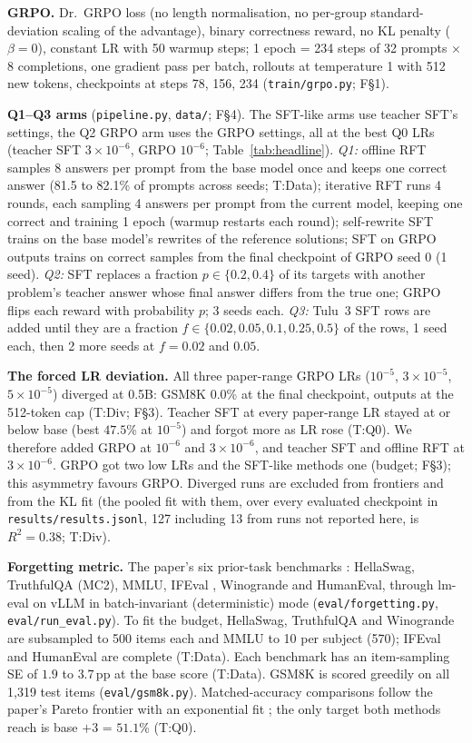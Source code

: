 \documentclass[11pt]{article}
\newcommand{\pp}{\,pp\xspace}
\newcommand{\T}[1]{\textsf{T:#1}}
\newcommand{\F}[1]{\textsf{F\S#1}}
\begin{document}
\textbf{GRPO.} Dr.~GRPO loss \cite{drgrpo} (no length normalisation, no per-group standard-deviation scaling of the
advantage), binary correctness reward, no KL penalty ($\beta = 0$), constant LR with 50 warmup steps; 1 epoch = 234
steps of 32 prompts $\times$ 8 completions, one gradient pass per batch, rollouts at temperature 1 with 512 new
tokens, checkpoints at steps 78, 156, 234 (\texttt{train/grpo.py}; \F{1}).

\textbf{Q1--Q3 arms} (\texttt{pipeline.py}, \texttt{data/}; \F{4}). The SFT-like arms use teacher SFT's settings, the
Q2 GRPO arm uses the GRPO settings, all at the best Q0 LRs (teacher SFT $3\times10^{-6}$, GRPO $10^{-6}$; Table~\ref{tab:headline}). \emph{Q1:} offline RFT samples 8
answers per prompt from the base model once and keeps one correct answer (81.5 to 82.1\% of prompts across seeds; \T{Data}); iterative RFT
runs 4 rounds, each sampling 4 answers per prompt from the current model, keeping one correct and training 1 epoch (warmup restarts each round);
self-rewrite SFT trains on the base model's rewrites of the reference solutions; SFT on GRPO outputs trains on
correct samples from the final checkpoint of GRPO seed 0 (1 seed). \emph{Q2:} SFT replaces a fraction
$p \in \{0.2, 0.4\}$ of its targets with another problem's teacher answer whose final answer differs from the true
one; GRPO flips each reward with probability $p$; 3 seeds each. \emph{Q3:} Tulu~3 \cite{tulu3} SFT rows are added
until they are a fraction $f \in \{0.02, 0.05, 0.1, 0.25, 0.5\}$ of the rows, 1 seed each, then 2 more seeds at
$f = 0.02$ and $0.05$.

\textbf{The forced LR deviation.} All three paper-range GRPO LRs ($10^{-5}$, $3\times10^{-5}$, $5\times10^{-5}$)
diverged at 0.5B: GSM8K $0.0$\% at the final checkpoint, outputs at the 512-token cap (\T{Div}; \F{3}). Teacher SFT
at every paper-range LR stayed at or below base (best $47.5$\% at $10^{-5}$) and forgot more as LR rose (\T{Q0}). We
therefore added GRPO at $10^{-6}$ and $3\times10^{-6}$, and teacher SFT and offline RFT at $3\times10^{-6}$. GRPO got
two low LRs and the SFT-like methods one (budget; \F{3}); this asymmetry favours GRPO. Diverged runs are excluded from
frontiers and from the KL fit (the pooled fit with them, over every evaluated checkpoint in \texttt{results/results.jsonl}, 127 including 13
from runs not reported here, is $R^2 = 0.38$; \T{Div}).

\textbf{Forgetting metric.} The paper's six prior-task benchmarks \cite[\S3.1, p.~4]{razor}: HellaSwag, TruthfulQA
(MC2), MMLU, IFEval \cite{ifeval}, Winogrande and HumanEval, through lm-eval \cite{lmeval} on vLLM in batch-invariant
(deterministic) mode (\texttt{eval/forgetting.py}, \texttt{eval/run\_eval.py}). To fit the budget, HellaSwag,
TruthfulQA and Winogrande are subsampled to 500 items each and MMLU to 10 per subject (570); IFEval and HumanEval are
complete (\T{Data}). Each benchmark has an item-sampling SE of $1.9$ to $3.7$\pp at the base score (\T{Data}). GSM8K is
scored greedily on all 1,319 test items (\texttt{eval/gsm8k.py}). Matched-accuracy comparisons follow the paper's
Pareto frontier with an exponential fit \cite[App.~B.1, p.~18]{razor}; the only target both methods reach is base
$+3$ = $51.1$\% (\T{Q0}).
\end{document}
